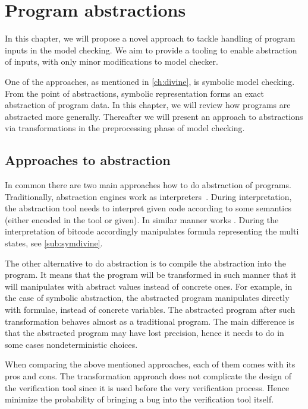 \chapter{Program abstractions}\label{ch:abstraction}

In this chapter, we will propose a novel approach to tackle
handling of program inputs in the model checking. We aim to provide a tooling to
enable abstraction of inputs, with only minor modifications to model checker.

One of the approaches, as mentioned in \autoref{ch:divine}, is symbolic model checking.
From the point of abstractions, symbolic representation forms an exact abstraction
of program data. In this chapter, we will review how programs are abstracted more generally.
Thereafter we will present an approach to abstractions via transformations
in the preprocessing phase of model checking.

\section{Approaches to abstraction}

In common there are two main approaches how to do abstraction of programs.
Traditionally, abstraction engines work as interpreters~\cite{Cousot79}. During
interpretation, the abstraction tool needs to interpret given code according
to some semantics (either encoded in the tool or given). In similar manner works
\SymDIVINE. During the interpretation of \LLVM bitcode \SymDIVINE accordingly
manipulates formula representing the multi states, see \autoref{sub:symdivine}.

The other alternative to do abstraction is to compile the abstraction into the
program. It means that the program will be transformed in such manner that it will
manipulates with abstract values instead of concrete ones. For example, in the
case of symbolic abstraction, the abstracted program manipulates directly with
formulae, instead of concrete variables. The abstracted program after such
transformation behaves almost as a traditional program. The main difference is
that the abstracted program may have lost precision, hence it needs to do
in some cases nondeterministic choices.

When comparing the above mentioned approaches, each of them comes with its pros
and cons. The transformation approach does not complicate the design of the
verification tool since it is used before the very verification process. Hence
minimize the probability of bringing a bug into the verification tool itself.

